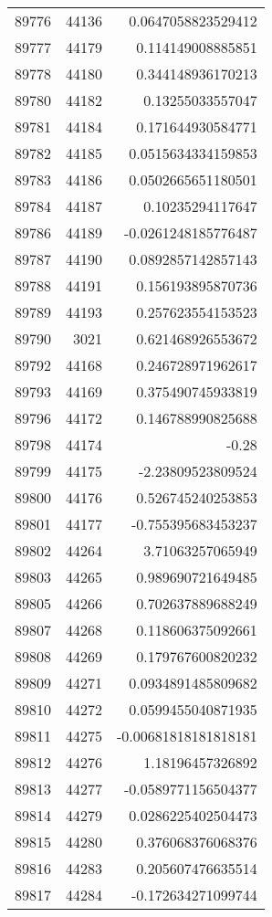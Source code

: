 \begin{tabular}{r | r | r}
89776 & 44136 & 0.0647058823529412 \\
89777 & 44179 & 0.114149008885851 \\
89778 & 44180 & 0.344148936170213 \\
89780 & 44182 & 0.13255033557047 \\
89781 & 44184 & 0.171644930584771 \\
89782 & 44185 & 0.0515634334159853 \\
89783 & 44186 & 0.0502665651180501 \\
89784 & 44187 & 0.10235294117647 \\
89786 & 44189 & -0.0261248185776487 \\
89787 & 44190 & 0.0892857142857143 \\
89788 & 44191 & 0.156193895870736 \\
89789 & 44193 & 0.257623554153523 \\
89790 & 3021 & 0.621468926553672 \\
89792 & 44168 & 0.246728971962617 \\
89793 & 44169 & 0.375490745933819 \\
89796 & 44172 & 0.146788990825688 \\
89798 & 44174 & -0.28 \\
89799 & 44175 & -2.23809523809524 \\
89800 & 44176 & 0.526745240253853 \\
89801 & 44177 & -0.755395683453237 \\
89802 & 44264 & 3.71063257065949 \\
89803 & 44265 & 0.989690721649485 \\
89805 & 44266 & 0.702637889688249 \\
89807 & 44268 & 0.118606375092661 \\
89808 & 44269 & 0.179767600820232 \\
89809 & 44271 & 0.0934891485809682 \\
89810 & 44272 & 0.0599455040871935 \\
89811 & 44275 & -0.00681818181818181 \\
89812 & 44276 & 1.18196457326892 \\
89813 & 44277 & -0.0589771156504377 \\
89814 & 44279 & 0.0286225402504473 \\
89815 & 44280 & 0.376068376068376 \\
89816 & 44283 & 0.205607476635514 \\
89817 & 44284 & -0.172634271099744 \\

\end{tabular}
